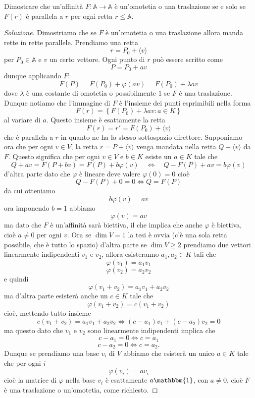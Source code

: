 \documentclass[11pt]{scrartcl}
\renewcommand{\AA}{\mathbb{A}}
\begin{document}
   	 \begin{exercise}
   	 	Dimostrare che un'affinità $F:\AA\to\AA$ è un'omotetia o una traslazione se e solo se $F(r)$ è parallela a $r$ per ogni retta $r\le \AA$.
   	 	\begin{proof}[Soluzione]
   	 		Dimostriamo che se $F$ è un'omotetia o una traslazione allora manda rette in rette parallele. Prendiamo una retta 
   	 		$$r=P_0+\langle v \rangle$$
   	 		per $P_0\in\AA$ e $v$ un certo vettore. Ogni punto di $r$ può essere scritto come
   	 		$$P=P_0+av$$
   	 		dunque applicando $F$:
   	 		$$F(P)=F(P_0)+\varphi(av)=F(P_0)+\lambda a v$$
   	 		dove $\lambda$ è una costante di omotetia o possibilmente $1$ se $F$ è una traslazione. Dunque notiamo che l'immagine di $F$ è l'insieme dei punti esprimibili nella forma
   	 		$$F(r)=\left\{F(P_0)+\lambda a v:a\in K\right\}$$
   	 		al variare di $a$. Questo insieme è esattamente la retta
   	 		$$F(r)=r'=F(P_0)+\langle v \rangle$$
   	 		che è parallela a $r$ in quanto ne ha lo stesso sottospazio direttore. Supponiamo ora che per ogni $v\in V$, la retta $r=P+\langle v \rangle$ venga mandata nella retta $Q+\langle v \rangle$ da $F$. Questo significa che per ogni $v\in V$ e $b\in K$ esiste un $a\in K$ tale che
   	 		$$Q+av=F(P+bv)=F(P)+b\varphi(v) \quad \iff \quad Q-F(P)+av=b\varphi(v) $$
   	 		d'altra parte dato che $\varphi$ è lineare deve valere $\varphi(0)=0$ cioè
   	 		$$Q-F(P)+0=0 \iff Q=F(P)$$ 
   	 		da cui otteniamo
   	 		$$b\varphi(v)=av$$
   	 		ora imponendo $b=1$ abbiamo
   	 		$$\varphi(v)=av$$
   	 		ma dato che $F$ è un'affinità sarà biettiva, il che implica che anche $\varphi$ è biettiva, cioè $a\ne 0$ per ogni $v$. Ora se $\dim V=1$ la tesi è ovvia (c'è una sola retta possibile, che è tutto lo spazio) d'altra parte se $\dim V \ge 2$ prendiamo due vettori linearmente indipendenti $v_1$ e $v_2$, allora esisteranno $a_1,a_2\in K$ tali che
   	 		$$\varphi(v_1)=a_1v_1$$
   	 		$$\varphi(v_2)=a_2v_2$$
   	 		e quindi
   	 		$$\varphi(v_1+v_2)=a_1v_1+a_2v_2$$
   	 		ma d'altra parte esisterà anche un $c\in K$ tale che
   	 		$$\varphi(v_1+v_2)=c(v_1+v_2)$$
   	 		cioè, mettendo tutto insieme
   	 		$$c(v_1+v_2)=a_1v_1+a_2v_2 \iff (c-a_1)v_1+(c-a_2)v_2=0$$
   	 		ma questo dato che $v_1$ e $v_2$ sono linearmente indipendenti implica che 
   	 		$$c-a_1=0 \iff c=a_1$$
   	 		$$c-a_2=0 \iff c=a_2.$$
   	 		Dunque se prendiamo una base $v_i$ di $V$ abbiamo che esisterà un unico $a\in K$ tale che per ogni $i$
   	 		$$\varphi(v_i)=av_i$$
   	 		cioè la matrice di $\varphi$ nella base $v_i$ è esattamente $a\mathbbm{1}$, con $a\ne 0$, cioè $F$ è una traslazione o un'omotetia, come richiesto.
   	 	\end{proof}
   	 \end{exercise}
   	 
\end{document}
